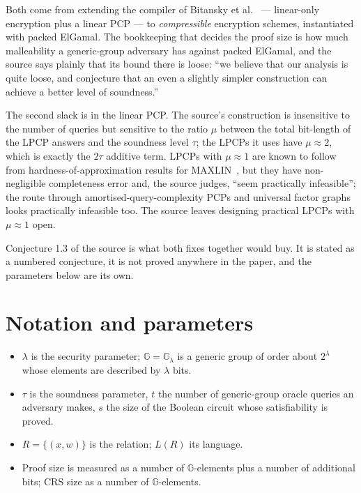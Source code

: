 \documentclass{conjura-conjecture}
\newcommand{\G}{\mathbb{G}}
\begin{document}
Both come from extending the compiler of Bitansky et
al.~\cite{BCIOP22} --- linear-only encryption plus a linear PCP --- to
\emph{compressible} encryption schemes, instantiated with packed
ElGamal. The bookkeeping that decides the proof size is how much
malleability a generic-group adversary has against packed ElGamal, and
the source says plainly that its bound there is loose: ``we believe that
our analysis is quite loose, and conjecture that an even a slightly
simpler construction can achieve a better level of soundness.''

The second slack is in the linear PCP\@. The source's construction is
insensitive to the number of queries but sensitive to the ratio $\mu$
between the total bit-length of the LPCP answers and the soundness level
$\tau$; the LPCPs it uses have $\mu \approx 2$, which is exactly the
$2\tau$ additive term. LPCPs with $\mu \approx 1$ are known to follow
from hardness-of-approximation results for
$\mathrm{MAXLIN}$~\cite{Has01}, but they have non-negligible completeness
error and, the source judges, ``seem practically infeasible''; the route
through amortised-query-complexity PCPs and universal factor graphs looks
practically infeasible too. The source leaves designing practical LPCPs
with $\mu \approx 1$ open.

Conjecture 1.3 of the source is what both fixes together would buy. It
is stated as a numbered conjecture, it is not proved anywhere in the
paper, and the parameters below are its own.

\section{Notation and parameters}\label{sec:notation}

\begin{itemize}[nosep]
  \item $\lambda$ is the security parameter; $\G = \G_{\lambda}$ is a
    generic group of order about $2^{\lambda}$ whose elements are
    described by $\lambda$ bits.
  \item $\tau$ is the soundness parameter, $t$ the number of generic-group
    oracle queries an adversary makes, $s$ the size of the Boolean
    circuit whose satisfiability is proved.
  \item $R = \{(x,w)\}$ is the relation; $L(R)$ its language.
  \item Proof size is measured as a number of $\G$-elements plus a number
    of additional bits; CRS size as a number of $\G$-elements.
\end{itemize}
\end{document}

